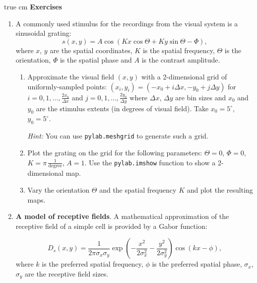 \documentclass[12pt, a4]{article}
\begin{document}
 true cm
{\bf Exercises}
\begin{enumerate}

    \item  A commonly used stimulus for the recordings from the visual
        system is a sinusoidal grating:
        \begin{equation}
            s(x, y) = A \cos(Kx\cos\Theta + Ky\sin\Theta
            -\Phi),
            \label{eq:grating}
        \end{equation}
        where $x$, $y$ are the spatial coordinates, $K$ is the spatial
        frequency, $\Theta$ is the orientation,  $\Phi$ is the spatial
        phase and $A$ is the contrast amplitude.

        \begin{enumerate}
            \item Approximate the visual field $(x,y)$ with a
                2-dimensional grid of uniformly-sampled points:
                $(x_i, y_i)= (-x_0+i\Delta x, -y_0+j\Delta y)$ for
                $i=0,1,\dots, \frac{2x_0}{\Delta x}$ and $j=0,1,\dots,
                \frac{2y_0}{\Delta y}$ where $\Delta x$, $\Delta y$
                are bin sizes and $x_0$ and $y_0$ are the
                stimulus extents (in degrees of visual field). Take
                $x_0=5^\circ$, $y_0=5^\circ$.
                
                \textit{Hint:} You can use
                \texttt{pylab.meshgrid} to generate such a grid. 
            \item \label{ex:grating} Plot the grating on the
                grid for the following parameters: $\Theta=0$,
                $\Phi=0$, $K=\pi\,\frac{1}{\mathrm{degree}}$, $A=1$.  Use the 
                \texttt{pylab.imshow} function to show a 2-dimensional map. 
            \item \label{ex:varygrating}Vary the orientation $\Theta$ and the
                spatial frequency $K$ and plot the resulting maps.
        \end{enumerate}

    \item \textbf{A model of receptive fields}. A mathematical approximation of the
        receptive field of a simple cell is provided by a Gabor
        function:

        \begin{equation}
           D_s(x,y)=\frac{1}{2\pi\sigma_x\sigma_y}
            \exp\left(-\frac{x^2}{2\sigma_x^2}-\frac
            {y^2}{ 2\sigma_y^2}\right)\cos(kx-\phi),
            \label{eq:Gabor}
        \end{equation}
        where  $k$ is the preferred spatial frequency, $\phi$ is
        the preferred spatial phase,  $\sigma_x$,
        $\sigma_y$ are the receptive field sizes.


\end{enumerate}
\end{document}
